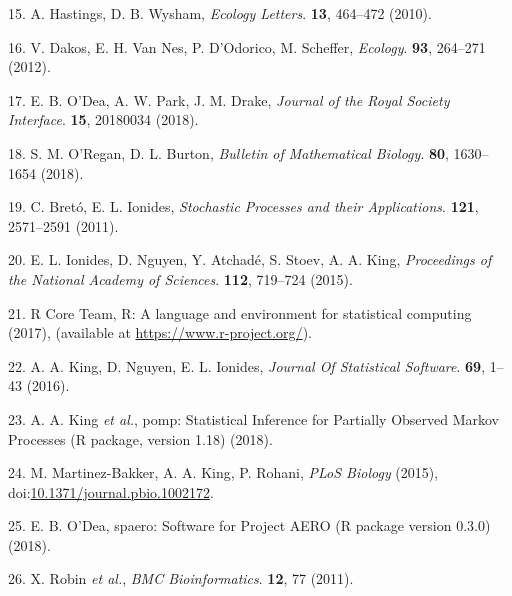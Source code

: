 \documentclass[3p]{elsarticle} %
\begin{document}
\hypertarget{ref-Hastings2010}{}
15. A. Hastings, D. B. Wysham, \emph{Ecology Letters}. \textbf{13},
464--472 (2010).

\hypertarget{ref-Dakos2012a}{}
16. V. Dakos, E. H. Van Nes, P. D'Odorico, M. Scheffer, \emph{Ecology}.
\textbf{93}, 264--271 (2012).

\hypertarget{ref-ODea2018a}{}
17. E. B. O'Dea, A. W. Park, J. M. Drake, \emph{Journal of the Royal
Society Interface}. \textbf{15}, 20180034 (2018).

\hypertarget{ref-ORegan2018}{}
18. S. M. O'Regan, D. L. Burton, \emph{Bulletin of Mathematical
Biology}. \textbf{80}, 1630--1654 (2018).

\hypertarget{ref-Breto2011}{}
19. C. Bretó, E. L. Ionides, \emph{Stochastic Processes and their
Applications}. \textbf{121}, 2571--2591 (2011).

\hypertarget{ref-Ionides2015}{}
20. E. L. Ionides, D. Nguyen, Y. Atchadé, S. Stoev, A. A. King,
\emph{Proceedings of the National Academy of Sciences}. \textbf{112},
719--724 (2015).

\hypertarget{ref-R2017}{}
21. R Core Team, R: A language and environment for statistical computing
(2017), (available at \url{https://www.r-project.org/}).

\hypertarget{ref-King2016}{}
22. A. A. King, D. Nguyen, E. L. Ionides, \emph{Journal Of Statistical
Software}. \textbf{69}, 1--43 (2016).

\hypertarget{ref-King2018}{}
23. A. A. King \emph{et al.}, pomp: Statistical Inference for Partially
Observed Markov Processes (R package, version 1.18) (2018).

\hypertarget{ref-Martinez-Bakker2015}{}
24. M. Martinez-Bakker, A. A. King, P. Rohani, \emph{PLoS Biology}
(2015),
doi:\href{https://doi.org/10.1371/journal.pbio.1002172}{10.1371/journal.pbio.1002172}.

\hypertarget{ref-ODea2018}{}
25. E. B. O'Dea, spaero: Software for Project AERO (R package version
0.3.0) (2018).

\hypertarget{ref-Robin2011}{}
26. X. Robin \emph{et al.}, \emph{BMC Bioinformatics}. \textbf{12}, 77
(2011).
\end{document}
